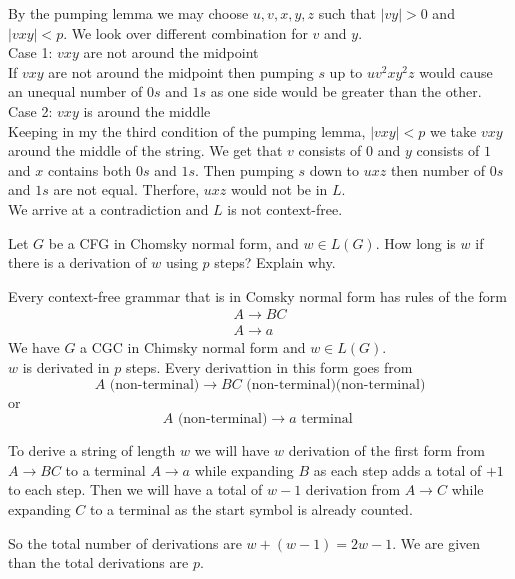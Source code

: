 \documentclass[12pt]{exam}
\begin{document}
\begin{questions}
\begin{solution}
\begin{parts}
      By the pumping lemma we may choose $u,v,x,y,z$ such that $|vy|> 0$ and $|vxy| < p$. We look over different combination for $v$ and $y$.\\
      Case 1: $vxy$ are not around the midpoint\\
      If $vxy$ are not around the midpoint then pumping $s$ up to $uv^{2}xy^{2}z$ would cause an unequal number of $0s$ and $1s$ as one side would be greater than the other.\\
      Case 2: $vxy$ is around the middle\\
      Keeping in my the third condition of the pumping lemma, $|vxy| < p$ we take $vxy$ around the middle of the string. We get that $v$ consists of $0$ and $y$ consists of $1$ and $x$ contains both $0s$ and $1s$. Then pumping $s$ down to $uxz$ then number of $0s$ and $1s$ are not equal. Therfore, $uxz$ would not be in $L$.\\
      We arrive at a contradiction and $L$ is not context-free.

    \end{parts}
    \end{solution}



  \question{} Let $G$ be a CFG in Chomsky normal form, and $w\in L(G)$. How long is $w$ if there is a derivation of $w$ using $p$ steps? Explain why.

  \begin{solution}
    Every context-free grammar that is in Comsky normal form has rules of the form
    \begin{gather*}
      A\to BC\\
      A\to a
    \end{gather*}
    We have $G$ a CGC in Chimsky normal form and $w\in L(G)$. \\$w$ is derivated in $p$ steps.
    Every derivattion in this form goes from \[A\text{ (non-terminal)} \to BC\text{ (non-terminal)(non-terminal)}\] or \[A\text{ (non-terminal)}\to a \text{ terminal }\]

    To derive a string of length $w$ we will have $w$ derivation of the first form from $A\to BC$ to a terminal $A\to a$ while expanding $B$ as each step adds a total of $+1$ to each step. Then we will have a total of $w-1$ derivation from $A\to C$ while expanding $C$ to a terminal as the start symbol is already counted.

    So the total number of derivations are $w + (w-1) = 2w-1$. We are given than the total derivations are $p$.


\end{solution}
\end{questions}
\end{document}
